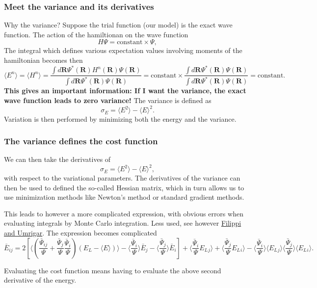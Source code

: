 \documentclass{beamer}
\begin{document}
\begin{frame}
\frametitle{Meet the variance and its derivatives}

\begin{block}{Why the variance? }
Suppose the trial function (our model) is the exact wave function. The action of the hamiltionan
on the wave function
\[
   H\Psi = \mathrm{constant}\times \Psi,
\]
The integral which defines various 
expectation values involving moments of the hamiltonian becomes then
\[
   \langle E^n \rangle =   \langle H^n \rangle =
   \frac{\int d\bm{R}\Psi^{\ast}(\bm{R})H^n(\bm{R})\Psi(\bm{R})}
        {\int d\bm{R}\Psi^{\ast}(\bm{R})\Psi(\bm{R})}=
\mathrm{constant}\times\frac{\int d\bm{R}\Psi^{\ast}(\bm{R})\Psi(\bm{R})}
        {\int d\bm{R}\Psi^{\ast}(\bm{R})\Psi(\bm{R})}=\mathrm{constant}.
\]
\textbf{This gives an important information: If I want the variance, the exact wave function leads to zero variance!}
The variance is defined as 
\[
\sigma_E = \langle E^2\rangle - \langle E\rangle^2.
\]
Variation is then performed by minimizing both the energy and the variance.

\end{block}
\end{frame}

\begin{frame}
\frametitle{The variance defines the cost function}

\begin{block}{}
We can then take the derivatives of 
\[
\sigma_E = \langle E^2\rangle - \langle E\rangle^2,
\]
with respect to the variational parameters. The derivatives of the variance can then be used to defined the
so-called Hessian matrix, which in turn allows us to use minimization methods like Newton's method or 
standard gradient methods. 

This leads to however a more complicated expression, with obvious errors when evaluating integrals by Monte Carlo integration. Less used, see however \href{{https://journals.aps.org/prl/abstract/10.1103/PhysRevLett.94.150201}}{Filippi and Umrigar}. The expression becomes complicated
\[
\bar{E}_{ij} = 2\left[ \langle (\frac{\bar{\Psi}_{ij}}{\Psi}+\frac{\bar{\Psi}_{j}}{\Psi}\frac{\bar{\Psi}_{i}}{\Psi})(E_L-\langle E\rangle)\rangle -\langle \frac{\bar{\Psi}_{i}}{\Psi}\rangle\bar{E}_j-\langle \frac{\bar{\Psi}_{j}}{\Psi}\rangle\bar{E}_i\right] +\langle \frac{\bar{\Psi}_{i}}{\Psi}E_L{_j}\rangle +\langle \frac{\bar{\Psi}_{j}}{\Psi}E_L{_i}\rangle -\langle \frac{\bar{\Psi}_{i}}{\Psi}\rangle\langle E_L{_j}\rangle \langle \frac{\bar{\Psi}_{j}}{\Psi}\rangle\langle E_L{_i}\rangle.  
\]

Evaluating the cost function means having to evaluate the above second derivative of the energy. 

\end{block}
\end{frame}
\end{document}
